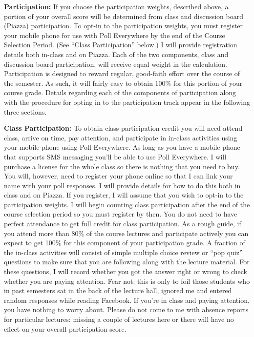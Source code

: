 \documentclass[11pt, letterpaper]{article}
\begin{document}
\medskip

\noindent \textbf{Participation:} If you choose the participation weights, described above, a portion of your overall score will be determined from class and discussion board (Piazza) participation. 
To opt-in to the participation weights, you must register your mobile phone for use with Poll Everywhere by the end of the Course Selection Period.
(See ``Class Participation'' below.)
I will provide registration details both in-class and on Piazza.
Each of the two components, class and discussion board participation, will receive equal weight in the calculation.
Participation is designed to reward regular, good-faith effort over the course of the semester.
As such, it will fairly easy to obtain 100\% for this portion of your course grade.
Details regarding each of the components of participation along with the procedure for opting in to the participation track appear in the following three sections.

\medskip 

\noindent \textbf{Class Participation:}
To obtain class participation credit you will need attend class, arrive on time, pay attention, and participate in in-class activities using your mobile phone using Poll Everywhere.
As long as you have a mobile phone that supports SMS messaging you'll be able to use Poll Everywhere. 
I will purchase a license for the whole class so there is nothing that you need to buy.
You will, however, need to register your phone online so that I can link your name with your poll responses.
I will provide details for how to do this both in class and on Piazza.
If you register, I will assume that you wish to opt-in to the participation weights. 
I will begin counting class participation after the end of the course selection period so you must register by then.
You do not need to have perfect attendance to get full credit for class participation.
As a rough guide, if you attend more than 80\% of the course lectures and participate actively you can expect to get 100\% for this component of your participation grade.
A fraction of the in-class activities will consist of simple multiple choice review or ``pop quiz'' questions to make sure that you are following along with the lecture material.
For these questions, I will record whether you got the answer right or wrong to check whether you are paying attention.
Fear not: this is only to foil those students who in past semesters sat in the back of the lecture hall, ignored me and entered random responses while reading Facebook.
If you're in class and paying attention, you have nothing to worry about.
Please do not come to me with absence reports for particular lectures: missing a couple of lectures here or there will have no effect on your overall participation score.
\end{document}
